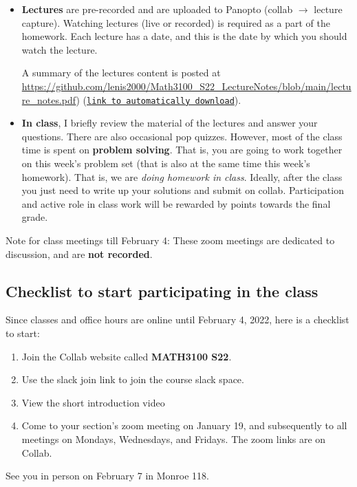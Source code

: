 \documentclass[oneside,11pt]{amsart}
\begin{document}
\begin{itemize}
	\item \textbf{Lectures} are pre-recorded and are uploaded to Panopto (collab $\to$ lecture capture). 
		Watching lectures (live or recorded) is required as 
		a part of the homework.
		Each lecture has a date, and this is the date by which you should watch the lecture.

		A summary of the lectures content is posted at 
		\url{https://github.com/lenis2000/Math3100_S22_LectureNotes/blob/main/lecture_notes.pdf})
		(\href{https://github.com/lenis2000/Math3100_S22_LectureNotes/raw/main/lecture_notes.pdf}
		{\texttt{link to automatically download}}).

		
	\item \textbf{In class}, I briefly review the material of the lectures
		and answer your 
		questions. There are also occasional pop quizzes.
		However, most of the class time is spent on \textbf{problem solving}.
		That is, you are going to work together 
		on this week's problem set (that is also at the same time this week's homework).
		That is, we are \emph{doing homework in class}.
		Ideally, after the class you just need to write up your solutions 
		and submit on collab. 
		Participation and active role in class work 
		will be rewarded by points towards the final grade.
\end{itemize}

Note for class meetings till February 4: These zoom meetings are 
dedicated to discussion, and are \textbf{not recorded}.

\subsection{Checklist to start participating in the class}

Since classes and office hours are online until February 4, 2022, here is a checklist to start:
\begin{enumerate}
	\item Join the Collab website called \textbf{MATH3100 S22}.
	\item Use the slack join link to join the course slack space.
	\item View the short introduction video
	\item Come to your section's zoom meeting on January 19, and subsequently to all 
		meetings on Mondays, Wednesdays, and Fridays. The zoom links are on Collab.
\end{enumerate}
See you in person on February 7 in Monroe 118.
\end{document}
